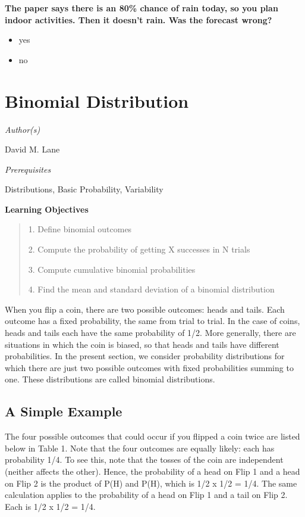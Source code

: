 \documentclass{book}
\begin{document}
\textbf{The paper says there is an 80\% chance of rain today, so you plan
indoor activities. Then it doesn't rain. Was the forecast wrong?}

\begin{itemize}
\item
  yes
\item
  no
\end{itemize}

\hypertarget{binomial-distribution}{%
\chapter{Binomial Distribution}\label{binomial-distribution}}

\emph{Author(s)}

David M. Lane

\emph{Prerequisites}

Distributions, Basic Probability, Variability

\textbf{Learning Objectives}

\begin{quote}
1. Define binomial outcomes

2. Compute the probability of getting X successes in N trials

3. Compute cumulative binomial probabilities

4. Find the mean and standard deviation of a binomial distribution
\end{quote}

When you flip a coin, there are two possible outcomes: heads and tails. Each
outcome has a fixed probability, the same from trial to trial. In the case of
coins, heads and tails each have the same probability of 1/2. More generally,
there are situations in which the coin is biased, so that heads and tails have
different probabilities. In the present section, we consider probability
distributions for which there are just two possible outcomes with fixed
probabilities summing to one. These distributions are called binomial
distributions.

\hypertarget{a-simple-example}{%
\section{A Simple Example}\label{a-simple-example}}

The four possible outcomes that could occur if you flipped a coin twice are
listed below in Table 1. Note that the four outcomes are equally likely: each
has probability 1/4. To see this, note that the tosses of the coin are
independent (neither affects the other). Hence, the probability of a head on
Flip 1 and a head on Flip 2 is the product of P(H) and P(H), which is 1/2 x
1/2 = 1/4. The same calculation applies to the probability of a head on Flip 1
and a tail on Flip 2. Each is 1/2 x 1/2 = 1/4.
\end{document}
